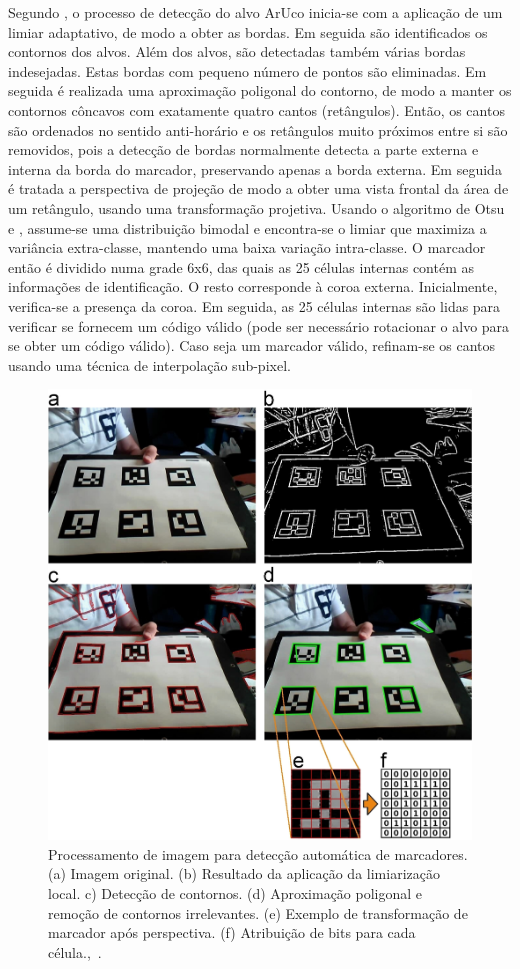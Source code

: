 Segundo \citet{Salinas2013}, o processo de detecção do alvo ArUco inicia-se com a aplicação de um limiar adaptativo, de modo a obter as bordas. Em seguida são identificados os contornos dos alvos. Além dos alvos, são detectadas também várias bordas indesejadas. Estas bordas com pequeno número de pontos são eliminadas. Em seguida é realizada uma aproximação poligonal do contorno, de modo a manter os contornos côncavos com exatamente quatro cantos (retângulos). Então, os cantos são ordenados no sentido anti-horário e os retângulos muito próximos entre si são removidos, pois a detecção de bordas normalmente detecta a parte externa e interna da borda do marcador, preservando apenas a borda externa. Em seguida é tratada a perspectiva de projeção de modo a obter uma vista frontal da área de um retângulo, usando uma transformação projetiva. Usando o algoritmo de Otsu \cite{OTSU1979} e \cite{Artero2000}, assume-se uma distribuição bimodal e encontra-se o limiar que maximiza a variância extra-classe, mantendo uma baixa variação intra-classe. O marcador então é dividido numa grade 6x6, das quais as 25 células internas contém as informações de identificação. O resto corresponde à coroa externa. Inicialmente, verifica-se a presença da coroa. Em seguida, as 25 células internas são lidas para verificar se fornecem um código válido (pode ser necessário rotacionar o alvo para se obter um código válido). Caso seja um marcador válido, refinam-se os cantos usando uma técnica de interpolação sub-pixel.

\begin{figure}[H]
	\centering
	\includegraphics[width=12cm, height=12 cm]{figuras/aruco-processamento.jpg}
	\caption{Processamento de imagem para detecção automática de marcadores. (a) Imagem original. (b) Resultado da aplicação da limiarização local. c) Detecção de contornos. (d) Aproximação poligonal e remoção de contornos irrelevantes. (e) Exemplo de transformação de marcador após perspectiva. (f) Atribuição de bits para cada célula.,~\cite{Aruco2014}.}
	\label{fig:aruco-processamento}
\end{figure}

